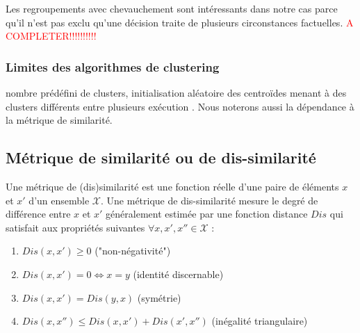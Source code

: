  Les regroupements avec chevauchement sont intéressants dans notre cas parce qu'il n'est pas exclu qu'une décision traite de plusieurs circonstances factuelles.
\textcolor{red}{A COMPLETER!!!!!!!!!!}

\subsubsection{Limites des algorithmes de clustering}
nombre prédéfini de clusters, initialisation aléatoire des centroïdes menant à des clusters différents entre plusieurs exécution \citep{sabzi2011fuzzykmedoids}. Nous noterons aussi la dépendance à la métrique de similarité.


\subsection{Métrique de similarité ou de dis-similarité}
Une métrique de (dis)similarité est une fonction réelle d'une paire de éléments $x$ et $x'$ d'un ensemble $\mathcal{X}$. Une métrique de dis-similarité mesure le degré de différence entre $x$ et $x'$  généralement estimée par une fonction distance $Dis$  qui satisfait aux propriétés suivantes $\forall x,x',x'' \in \mathcal{X}$ \citep{wang2015distancemetriclearningsurvey}:
\begin{enumerate}
\item $Dis(x,x') \geq 0$ ("non-négativité")
\item $Dis(x,x') = 0  \Leftrightarrow x = y$ (identité discernable)
\item $Dis(x,x') = Dis(y, x)$ (symétrie)
\item $Dis(x,x'') \leq Dis(x,x') + Dis(x',x'')$ (inégalité triangulaire) \label{enum:sim:ineq-tri}
\end{enumerate}


